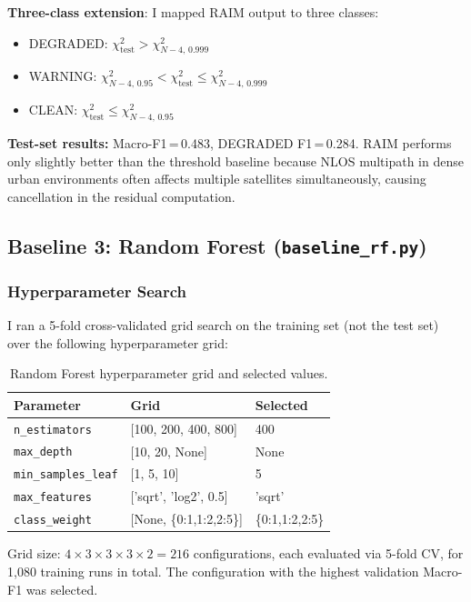\documentclass[12pt,a4paper]{article}
\newcommand{\code}[1]{\texttt{#1}}
\begin{document}
\textbf{Three-class extension}: I mapped RAIM output to three classes:
\begin{itemize}
  \item DEGRADED: $\chi^2_\mathrm{test} > \chi^2_{N-4,\,0.999}$
  \item WARNING: $\chi^2_{N-4,\,0.95} < \chi^2_\mathrm{test} \leq \chi^2_{N-4,\,0.999}$
  \item CLEAN: $\chi^2_\mathrm{test} \leq \chi^2_{N-4,\,0.95}$
\end{itemize}

\textbf{Test-set results:} Macro-F1\,=\,0.483, DEGRADED F1\,=\,0.284.
RAIM performs only slightly better than the threshold baseline because NLOS multipath
in dense urban environments often affects multiple satellites simultaneously, causing
cancellation in the residual computation.

\subsection{Baseline 3: Random Forest (\texttt{baseline\_rf.py})}

\subsubsection{Hyperparameter Search}

I ran a 5-fold cross-validated grid search on the training set (not the test set)
over the following hyperparameter grid:

\begin{table}[H]
  \centering
  \caption{Random Forest hyperparameter grid and selected values.}
  \begin{tabular}{lll}
    \toprule
    \textbf{Parameter} & \textbf{Grid} & \textbf{Selected} \\
    \midrule
    \code{n\_estimators}      & [100, 200, 400, 800] & 400 \\
    \code{max\_depth}         & [10, 20, None] & None \\
    \code{min\_samples\_leaf} & [1, 5, 10] & 5 \\
    \code{max\_features}      & ['sqrt', 'log2', 0.5] & 'sqrt' \\
    \code{class\_weight}      & [None, \{0:1,1:2,2:5\}] & \{0:1,1:2,2:5\} \\
    \bottomrule
  \end{tabular}
\end{table}

Grid size: $4 \times 3 \times 3 \times 3 \times 2 = 216$ configurations,
each evaluated via 5-fold CV, for 1,080 training runs in total.
The configuration with the highest validation Macro-F1 was selected.
\end{document}
